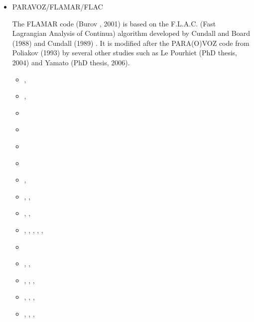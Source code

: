 \begin{itemize}
\item PARAVOZ/FLAMAR/FLAC 

The FLAMAR code (Burov \etal, 2001) is based on the
F.L.A.C. (Fast Lagrangian Analysis of Continua) algorithm developed by Cundall and Board (1988) 
and Cundall (1989) \cite{cund89}. It is modified after the PARA(O)VOZ code from 
Poliakov \etal (1993) \cite{pocp93} by several
other studies such as Le Pourhiet (PhD thesis, 2004) and Yamato (PhD thesis, 2006).

\begin{scriptsize}
\begin{itemize}
\item[\nineteeneightynine]   \textcite{cund89},  \textcite{hoor89}
\item[\nineteenninetythree]  \textcite{pocp93},  \textcite{zhhj93}
\item[\nineteenninetyfour]   \textcite{wizh94}
\item[\nineteenninetysix]    \textcite{zhho96}
\item[\nineteenninetyeight]  \textcite{gepd98}
\item[\twothousand]          \textcite{labp00}
\item[\twothousandone]       \textcite{bujl01},  \textcite{bupo01}
\item[\twothousandtwo]       \textcite{bast02},  \textcite{clbb02},  \textcite{kozc02}
\item[\twothousandthree]     \textcite{hags03},  \textcite{gehd03},  \textcite{upke03}
\item[\twothousandfour]      \textcite{guhl04},  \textcite{gewi04},  
                             \textcite{toba04},  \textcite{tibb04},
                             \textcite{clbm04},  \textcite{tobj04}
\item[\twothousandfive]      \textcite{bugu05}
\item[\twothousandsix]       \textcite{buwa06},  \textcite{lemm06}, \textcite{legs06}
\item[\twothousandseven]     \textcite{nabu07},  \textcite{yaab07}, 
                             \textcite{buto07},  \textcite{chem07}
\item[\twothousandeight]     \textcite{yaba08},  \textcite{tibb08}, 
                             \textcite{buya08},  \textcite{gogm08}
\item[\twothousandnine]      \textcite{gecm09},  \textcite{yahb09},  \textcite{bucl09},  

\end{itemize}
\end{scriptsize}
\end{itemize}
